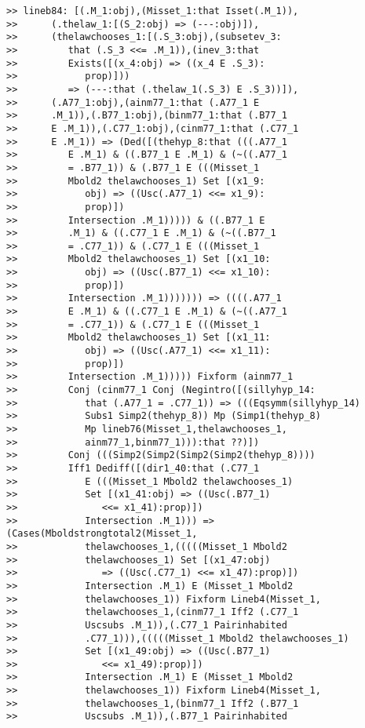 \documentclass[12pt]{article}
\begin{document}
\begin{verbatim}
>> lineb84: [(.M_1:obj),(Misset_1:that Isset(.M_1)),
>>      (.thelaw_1:[(S_2:obj) => (---:obj)]),
>>      (thelawchooses_1:[(.S_3:obj),(subsetev_3:
>>         that (.S_3 <<= .M_1)),(inev_3:that
>>         Exists([(x_4:obj) => ((x_4 E .S_3):
>>            prop)]))
>>         => (---:that (.thelaw_1(.S_3) E .S_3))]),
>>      (.A77_1:obj),(ainm77_1:that (.A77_1 E
>>      .M_1)),(.B77_1:obj),(binm77_1:that (.B77_1
>>      E .M_1)),(.C77_1:obj),(cinm77_1:that (.C77_1
>>      E .M_1)) => (Ded([(thehyp_8:that (((.A77_1
>>         E .M_1) & ((.B77_1 E .M_1) & (~((.A77_1
>>         = .B77_1)) & (.B77_1 E (((Misset_1
>>         Mbold2 thelawchooses_1) Set [(x1_9:
>>            obj) => ((Usc(.A77_1) <<= x1_9):
>>            prop)])
>>         Intersection .M_1))))) & ((.B77_1 E
>>         .M_1) & ((.C77_1 E .M_1) & (~((.B77_1
>>         = .C77_1)) & (.C77_1 E (((Misset_1
>>         Mbold2 thelawchooses_1) Set [(x1_10:
>>            obj) => ((Usc(.B77_1) <<= x1_10):
>>            prop)])
>>         Intersection .M_1))))))) => ((((.A77_1
>>         E .M_1) & ((.C77_1 E .M_1) & (~((.A77_1
>>         = .C77_1)) & (.C77_1 E (((Misset_1
>>         Mbold2 thelawchooses_1) Set [(x1_11:
>>            obj) => ((Usc(.A77_1) <<= x1_11):
>>            prop)])
>>         Intersection .M_1))))) Fixform (ainm77_1
>>         Conj (cinm77_1 Conj (Negintro([(sillyhyp_14:
>>            that (.A77_1 = .C77_1)) => (((Eqsymm(sillyhyp_14)
>>            Subs1 Simp2(thehyp_8)) Mp (Simp1(thehyp_8)
>>            Mp lineb76(Misset_1,thelawchooses_1,
>>            ainm77_1,binm77_1))):that ??)])
>>         Conj (((Simp2(Simp2(Simp2(Simp2(thehyp_8))))
>>         Iff1 Dediff([(dir1_40:that (.C77_1
>>            E (((Misset_1 Mbold2 thelawchooses_1)
>>            Set [(x1_41:obj) => ((Usc(.B77_1)
>>               <<= x1_41):prop)])
>>            Intersection .M_1))) => (Cases(Mboldstrongtotal2(Misset_1,
>>            thelawchooses_1,(((((Misset_1 Mbold2
>>            thelawchooses_1) Set [(x1_47:obj)
>>               => ((Usc(.C77_1) <<= x1_47):prop)])
>>            Intersection .M_1) E (Misset_1 Mbold2
>>            thelawchooses_1)) Fixform Lineb4(Misset_1,
>>            thelawchooses_1,(cinm77_1 Iff2 (.C77_1
>>            Uscsubs .M_1)),(.C77_1 Pairinhabited
>>            .C77_1))),(((((Misset_1 Mbold2 thelawchooses_1)
>>            Set [(x1_49:obj) => ((Usc(.B77_1)
>>               <<= x1_49):prop)])
>>            Intersection .M_1) E (Misset_1 Mbold2
>>            thelawchooses_1)) Fixform Lineb4(Misset_1,
>>            thelawchooses_1,(binm77_1 Iff2 (.B77_1
>>            Uscsubs .M_1)),(.B77_1 Pairinhabited

\end{verbatim}
\end{document}
